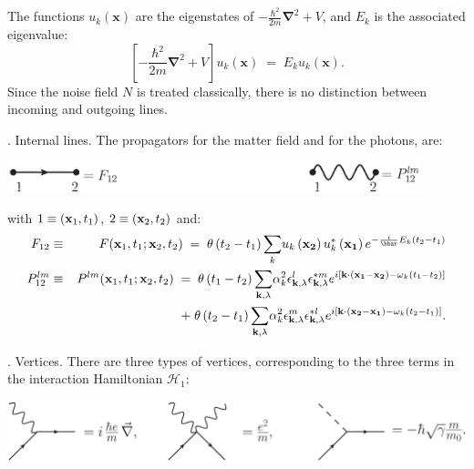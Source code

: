 \documentclass[12pt,onecolumn,amssymb,nofootinbib]{revtex4-2} %
\newcommand*{\boldvec}[1]{\ensuremath{\boldsymbol{#1}}}%
\let\vec\boldvec%
\begin{document}
The functions $u_{k}(\mathbf{x})$ are the eigenstates of
$-\frac{\hbar^{2}}{2m}\vec{\nabla}^{2} + V$, and $E_k$ is the associated
eigenvalue:
\[
\left[-\frac{\hbar^{2}}{2m}\vec{\nabla}^{2} + V\right]u_{k}(\mathbf{x}) \; =
\; E_{k}u_{k}(\mathbf{x}).
\]
Since the noise field $N$ is treated classically, there is no distinction
between incoming and outgoing lines.

. Internal lines. The propagators for the matter field and for the
photons, are:

\begin{center}
{\includegraphics[width=12cm, keepaspectratio]{propagator.eps}}
\end{center}

with $1 \equiv ({\bf x}_1, t_1)$, $2 \equiv ({\bf x}_2, t_2)$ and:
\begin{eqnarray}
F_{12} & \equiv & F({\bf x}_1,t_1;{\bf x}_2,t_2) \; = \;
\theta\left(t_{2}-t_{1}\right)\underset{k}{\sum}u_{k}\left(\mathbf{x_{2}}\right)
u_{k}^{*}\left(\mathbf{x_{1}}\right)e^{-\frac{i}{\hbar}E_{k}\left(t_{2}-t_{1}\right)}
\label{eq:fgfdssd} \\
P^{lm}_{12} & \equiv & P^{lm}({\bf x}_1,t_1;{\bf x}_2,t_2) \; = \;
\theta\left(t_{1}-t_{2}\right)\underset{\mathbf{k},\lambda}
{\sum}\alpha_{k}^{2}\epsilon_{\mathbf{k},\lambda}^{l}
\epsilon_{\mathbf{k},\lambda}^{*m}e^{i\left[\mathbf{k}\cdot\left(\mathbf{x_{1}}-
\mathbf{x_{2}}\right)-\omega_{k}\left(t_{1}-t_{2}\right)\right]} \nonumber \\
& & \qquad\qquad\qquad\qquad\; + \; \theta\left(t_{2}-t_{1}\right)\underset{\mathbf{k},
\lambda}
{\sum}\alpha_{k}^{2}\epsilon_{\mathbf{k},\lambda}^{m}\epsilon_{\mathbf{k},\lambda}^{*l}
e^{i\left[\mathbf{k}\cdot\left(\mathbf{x_{2}}-\mathbf{x_{1}}\right)-\omega_{k}\left(t_{2}-t_
{1}\right)\right]}.
\end{eqnarray}

. Vertices. There are three types of vertices, corresponding to the
three terms in the interaction Hamiltonian ${\mathcal H}_1$:

\begin{center}
{\includegraphics[width=14cm, keepaspectratio]{vertex.eps}}
\end{center}
\end{document}
